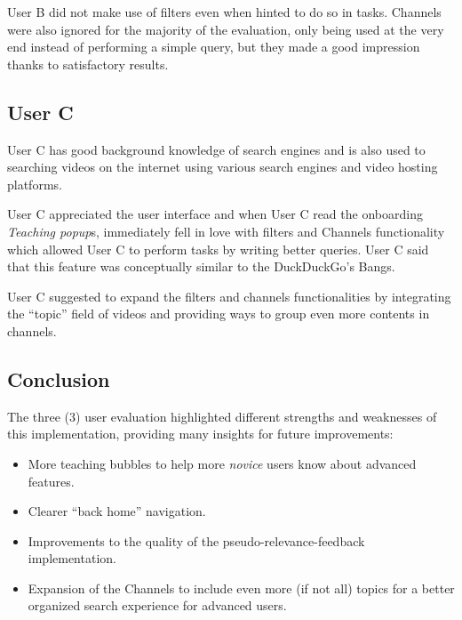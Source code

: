 \documentclass[12pt]{exam}
\begin{document}
User B did not make use of filters even when hinted to do so in tasks. Channels
were also ignored for the majority of the evaluation, only being used at the
very end instead of performing a simple query, but they made a good impression
thanks to satisfactory results.

\subsection{User C}

User C has good background knowledge of search engines and is also used to
searching videos on the internet using various search engines and video hosting
platforms.

User C appreciated the user interface and when User C read the onboarding
\textit{Teaching popup}s, immediately fell in love with filters and Channels
functionality which allowed User C to perform tasks by writing better queries.
User C said that this feature was conceptually similar to the
DuckDuckGo's Bangs.

User C suggested to expand the filters and channels functionalities by 
integrating the ``topic'' field of videos and providing ways to group even more
contents in channels.

\subsection{Conclusion}

The three (3) user evaluation highlighted different strengths and weaknesses
of this implementation, providing many insights for future improvements:

\begin{itemize}
\item More teaching bubbles to help more \textit{novice} users know about
      advanced features.
\item Clearer ``back home'' navigation.
\item Improvements to the quality of the pseudo-relevance-feedback
      implementation.
\item Expansion of the Channels to include even more (if not all) topics
      for a better organized search experience for advanced users.
\end{itemize}
\end{document}
